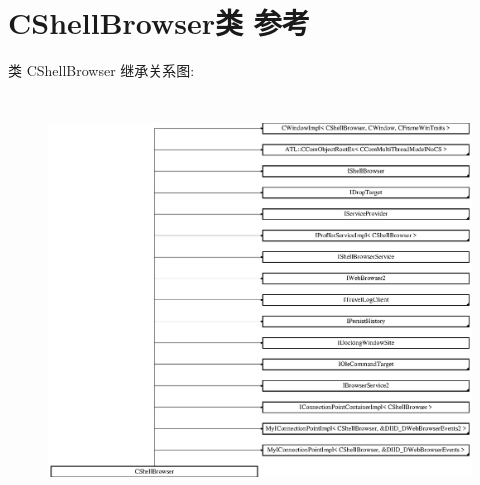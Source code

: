 \hypertarget{class_c_shell_browser}{}\section{C\+Shell\+Browser类 参考}
\label{class_c_shell_browser}
类 C\+Shell\+Browser 继承关系图\+:\begin{figure}[H]
\begin{center}
\leavevmode
\includegraphics[height=10.867580cm]{class_c_shell_browser}
\end{center}
\end{figure}
